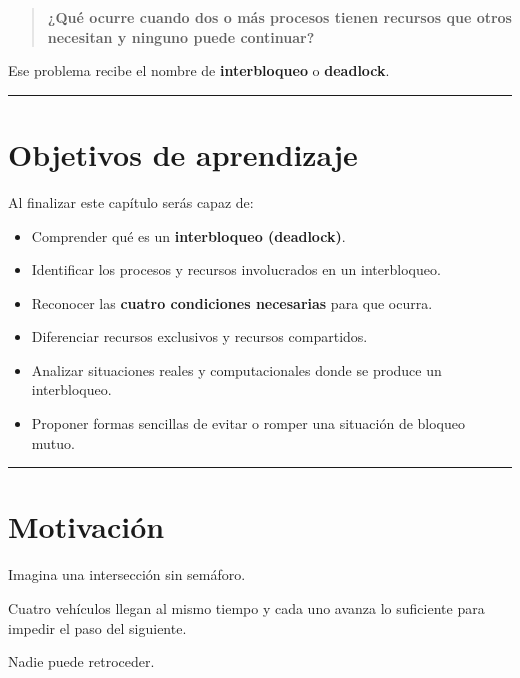 \documentclass[
  spanish,
  letterpaper,
]{scrbook}
\providecommand{\tightlist}{%
  \setlength{\itemsep}{0pt}\setlength{\parskip}{0pt}}
\begin{document}
\begin{quote}
\textbf{¿Qué ocurre cuando dos o más procesos tienen recursos que otros
necesitan y ninguno puede continuar?}
\end{quote}

Ese problema recibe el nombre de \textbf{interbloqueo} o
\textbf{deadlock}.

\begin{center}\rule{0.5\linewidth}{0.5pt}\end{center}


\chapter{Objetivos de aprendizaje}\label{objetivos-de-aprendizaje-6}

Al finalizar este capítulo serás capaz de:

\begin{itemize}
\tightlist
\item
  Comprender qué es un \textbf{interbloqueo (deadlock)}.
\item
  Identificar los procesos y recursos involucrados en un interbloqueo.
\item
  Reconocer las \textbf{cuatro condiciones necesarias} para que ocurra.
\item
  Diferenciar recursos exclusivos y recursos compartidos.
\item
  Analizar situaciones reales y computacionales donde se produce un
  interbloqueo.
\item
  Proponer formas sencillas de evitar o romper una situación de bloqueo
  mutuo.
\end{itemize}

\begin{center}\rule{0.5\linewidth}{0.5pt}\end{center}


\chapter{Motivación}\label{motivaciuxf3n-2}

Imagina una intersección sin semáforo.

Cuatro vehículos llegan al mismo tiempo y cada uno avanza lo suficiente
para impedir el paso del siguiente.

Nadie puede retroceder.
\end{document}
